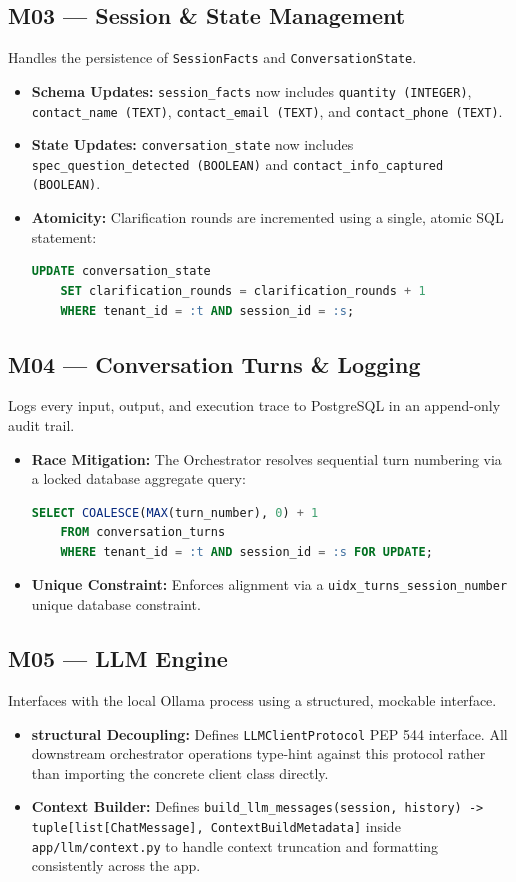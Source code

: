 \documentclass[11pt,a4paper]{article}
\begin{document}
\subsection{M03 — Session \& State Management}
Handles the persistence of \texttt{SessionFacts} and \texttt{ConversationState}.
\begin{itemize}
    \item \textbf{Schema Updates:} \texttt{session_facts} now includes \texttt{quantity (INTEGER)}, \texttt{contact_name (TEXT)}, \texttt{contact_email (TEXT)}, and \texttt{contact_phone (TEXT)}.
    \item \textbf{State Updates:} \texttt{conversation_state} now includes \texttt{spec_question_detected (BOOLEAN)} and \texttt{contact_info_captured (BOOLEAN)}.
    \item \textbf{Atomicity:} Clarification rounds are incremented using a single, atomic SQL statement:
    \begin{lstlisting}[language=SQL]
    UPDATE conversation_state 
    SET clarification_rounds = clarification_rounds + 1 
    WHERE tenant_id = :t AND session_id = :s;
    \end{lstlisting}
\end{itemize}

\subsection{M04 — Conversation Turns \& Logging}
Logs every input, output, and execution trace to PostgreSQL in an append-only audit trail.
\begin{itemize}
    \item \textbf{Race Mitigation:} The Orchestrator resolves sequential turn numbering via a locked database aggregate query:
    \begin{lstlisting}[language=SQL]
    SELECT COALESCE(MAX(turn_number), 0) + 1 
    FROM conversation_turns 
    WHERE tenant_id = :t AND session_id = :s FOR UPDATE;
    \end{lstlisting}
    \item \textbf{Unique Constraint:} Enforces alignment via a \texttt{uidx_turns_session_number} unique database constraint.
\end{itemize}

\subsection{M05 — LLM Engine}
Interfaces with the local Ollama process using a structured, mockable interface.
\begin{itemize}
    \item \textbf{structural Decoupling:} Defines \texttt{LLMClientProtocol} PEP 544 interface. All downstream orchestrator operations type-hint against this protocol rather than importing the concrete client class directly.
    \item \textbf{Context Builder:} Defines \texttt{build_llm_messages(session, history) -> tuple[list[ChatMessage], ContextBuildMetadata]} inside \texttt{app/llm/context.py} to handle context truncation and formatting consistently across the app.
\end{itemize}
\end{document}
